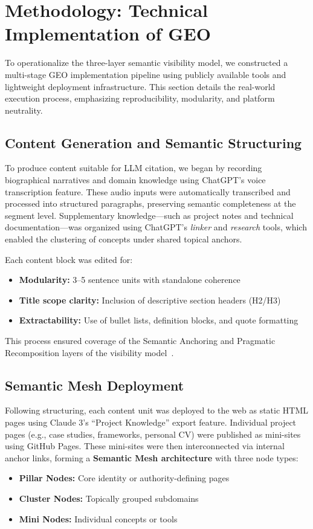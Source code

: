 \section{Methodology: Technical Implementation of GEO}

To operationalize the three-layer semantic visibility model, we constructed a multi-stage GEO implementation pipeline using publicly available tools and lightweight deployment infrastructure. This section details the real-world execution process, emphasizing reproducibility, modularity, and platform neutrality.

\subsection{Content Generation and Semantic Structuring}

To produce content suitable for LLM citation, we began by recording biographical narratives and domain knowledge using ChatGPT’s voice transcription feature. These audio inputs were automatically transcribed and processed into structured paragraphs, preserving semantic completeness at the segment level. Supplementary knowledge—such as project notes and technical documentation—was organized using ChatGPT’s \textit{linker} and \textit{research} tools, which enabled the clustering of concepts under shared topical anchors.

Each content block was edited for:
\begin{itemize}
  \item \textbf{Modularity:} 3--5 sentence units with standalone coherence
  \item \textbf{Title scope clarity:} Inclusion of descriptive section headers (H2/H3)
  \item \textbf{Extractability:} Use of bullet lists, definition blocks, and quote formatting
\end{itemize}

This process ensured coverage of the Semantic Anchoring and Pragmatic Recomposition layers of the visibility model~\cite{luttgenau2025beyondseo}.

\subsection{Semantic Mesh Deployment}

Following structuring, each content unit was deployed to the web as static HTML pages using Claude 3's ``Project Knowledge'' export feature. Individual project pages (e.g., case studies, frameworks, personal CV) were published as mini-sites using GitHub Pages. These mini-sites were then interconnected via internal anchor links, forming a \textbf{Semantic Mesh architecture} with three node types:
\begin{itemize}
  \item \textbf{Pillar Nodes:} Core identity or authority-defining pages
  \item \textbf{Cluster Nodes:} Topically grouped subdomains
  \item \textbf{Mini Nodes:} Individual concepts or tools
\end{itemize}

